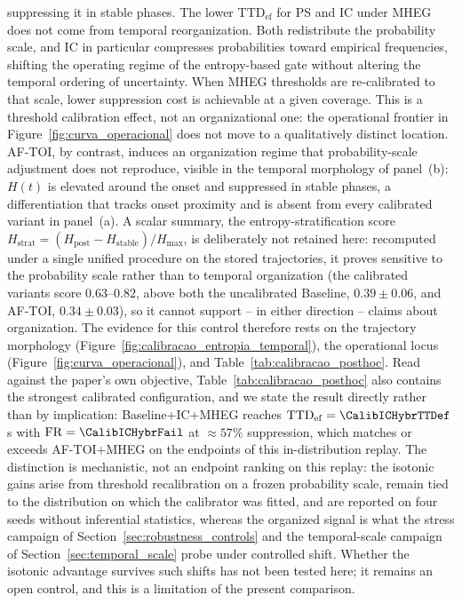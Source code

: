 \documentclass[a4paper,fleqn]{cas-dc}
\newcommand{\AFTOI}{\mbox{AF-TOI}\xspace}
\newcommand{\MHEG}{\mbox{MHEG}\xspace}
\begin{document}
suppressing it in stable phases.
The lower $\mathrm{TTD}_{\mathrm{ef}}$ for PS and IC under \MHEG does not come
from temporal reorganization. Both redistribute the probability scale, and IC in
particular compresses probabilities toward empirical frequencies, shifting the
operating regime of the entropy-based gate without altering the temporal
ordering of uncertainty. When \MHEG thresholds are re-calibrated to that scale,
lower suppression cost is achievable at a given coverage. This is a threshold
calibration effect, not an organizational one: the operational frontier in
Figure~\ref{fig:curva_operacional} does not move to a qualitatively distinct
location. \AFTOI, by contrast, induces an organization regime that
probability-scale adjustment does not reproduce, visible in the temporal
morphology of panel~(b): $H(t)$ is elevated around the onset and suppressed in
stable phases, a differentiation that tracks onset proximity and is absent
from every calibrated variant in panel~(a).
{\color{\revcolor}A scalar summary, the entropy-stratification score
$H_{\mathrm{strat}} = (H_{\mathrm{post}}-H_{\mathrm{stable}})/H_{\max}$, is
deliberately not retained here: recomputed under a single unified procedure on
the stored trajectories, it proves sensitive to the probability scale rather
than to temporal organization (the calibrated variants score $0.63$--$0.82$, above
both the uncalibrated Baseline, $0.39 \pm 0.06$, and \AFTOI,
$0.34 \pm 0.03$), so it cannot support -- in either direction -- claims about
organization. The evidence for this control therefore rests on the trajectory
morphology (Figure~\ref{fig:calibracao_entropia_temporal}), the operational
locus (Figure~\ref{fig:curva_operacional}), and
Table~\ref{tab:calibracao_posthoc}.}
{\color{\revcolor}Read against the paper's own objective,
Table~\ref{tab:calibracao_posthoc} also contains the strongest calibrated
configuration, and we state the result directly rather than by implication:
Baseline+IC+MHEG reaches $\mathrm{TTD}_{\mathrm{ef}} = \CalibICHybrTTDef$\,s
with $\mathrm{FR}=\CalibICHybrFail$ at $\approx 57\%$ suppression, which
matches or exceeds \mbox{AF-TOI}+MHEG on the endpoints of this
in-distribution replay. The distinction is mechanistic, not an endpoint
ranking on this replay: the isotonic gains arise from threshold recalibration
on a frozen probability scale, remain tied to the distribution on which the
calibrator was fitted, and are reported on four seeds without inferential
statistics, whereas the organized signal is what the stress campaign of
Section~\ref{sec:robustness_controls} and the temporal-scale campaign of
Section~\ref{sec:temporal_scale} probe under controlled shift. Whether the
isotonic advantage survives such shifts has not been tested here; it remains
an open control, and this is a limitation of the present comparison.}
\end{document}

